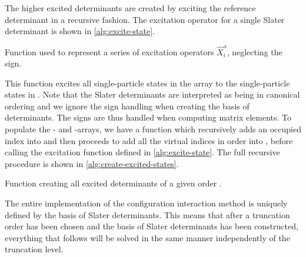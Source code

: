             The higher excited determinants are created by exciting the
            reference determinant in a recursive fashion.
            The excitation operator for a single Slater determinant is shown in
            \autoref{alg:excite-state}.
            \begin{algorithm}
                \caption{Function used to represent a series of excitation
                operators $\hat{X}^{a}_{i}$, neglecting the sign.}
                \label{alg:excite-state}
            \end{algorithm}
            This function excites all single-particle states in the array
             to the single-particle states in .
            Note that the Slater determinants are interpreted as being in
            canonical ordering and we ignore the sign handling when creating the
            basis of determinants.
            The signs are thus handled when computing matrix elements.
            To populate the - and -arrays, we have
            a function which recursively adds an occupied index into
             and then proceeds to add all the virtual indices in
            order into , before calling the excitation function
            defined in \autoref{alg:excite-state}.
            The full recursive procedure is shown in
            \autoref{alg:create-excited-states}.
            \begin{algorithm}
                \caption{Function creating all excited determinants of a given
                order .}
                \label{alg:create-excited-states}
            \end{algorithm}
            The entire implementation of the configuration interaction method is
            uniquely defined by the basis of Slater determinants.
            This means that after a truncation order has been chosen and the
            basis of Slater determinants has been constructed, everything that
            follows will be solved in the same manner independently of the
            truncation level.

